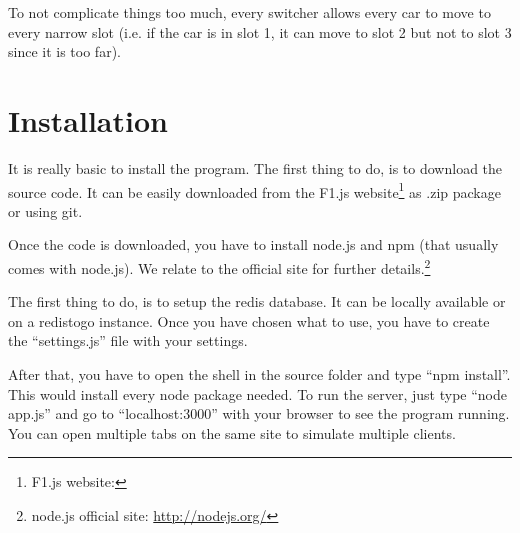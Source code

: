 To not complicate things too much, every switcher allows every car to move to every narrow slot (i.e. if the car is in slot 1, it can move to slot 2 but not to slot 3 since it is too far).

\appendix
\section{Installation}

It is really basic to install the program. The first thing to do, is to download the source code. It can be easily downloaded from the F1.js website\footnote{F1.js website: \PROJECTurl} as .zip package or using git.

Once the code is downloaded, you have to install node.js and npm (that usually comes with node.js). We relate to the official site for further details.\footnote{node.js official site: \url{http://nodejs.org/}}

The first thing to do, is to setup the redis database. It can be locally available or on a redistogo instance. Once you have chosen what to use, you have to create the ``settings.js'' file with your settings.

After that, you have to open the shell in the source folder and type ``npm install''. This would install every node package needed. To run the server, just type ``node app.js'' and go to ``localhost:3000'' with your browser to see the program running. You can open multiple tabs on the same site to simulate multiple clients.









